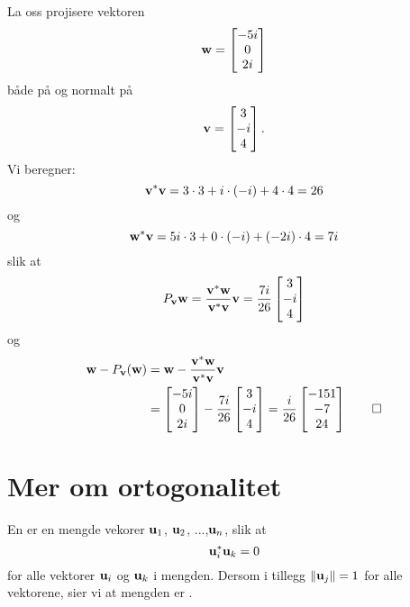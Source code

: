 \begin{ex}
La oss projisere vektoren 
\[
\mathbf{w}=
\begin{bmatrix}
 -5i  \\
 0  \\
2i 
\end{bmatrix}
\]
både på og normalt på
\[
\mathbf{v}=
\begin{bmatrix}
 3 \\
 -i \\
 4
\end{bmatrix}.
\]
Vi beregner:
\[
\mathbf{v}^* \mathbf{v}=3\cdot 3+i\cdot (-i)+4\cdot 4=26
\]
og
\[
\mathbf{w}^* \mathbf{v}=5i\cdot 3+0\cdot (-i)+(-2i)\cdot 4=7i
\]
slik at
\begin{align*}
P_{\mathbf{v}}\mathbf{w} =\frac{ \mathbf{v}^*\mathbf{w}}{\mathbf{v}^* \mathbf{v}} \mathbf{v} =
\frac{7i}{26}
\begin{bmatrix}
 3 \\
 -i \\
 4
\end{bmatrix}
\end{align*}
og 
\begin{align*}
 \mathbf{w}-P_{\mathbf{v}}(\mathbf{w})&=\mathbf{w}-\frac{ \mathbf{v}^*\mathbf{w}}{\mathbf{v}^* \mathbf{v}} \mathbf{v} \\&= 
\begin{bmatrix}
 -5i  \\
 0  \\
2i 
\end{bmatrix}
-
\frac{7i}{26}
\begin{bmatrix}
 3 \\
 -i \\
 4
\end{bmatrix}
=
\frac{i}{26}
\begin{bmatrix}
 -151 \\
 -7 \\
 24
\end{bmatrix}\qedhere
\end{align*} 
\end{ex}


\section*{Mer om ortogonalitet}
\begin{defnx}
En  er en mengde vekorer $\mathbf{u}_1$, $\mathbf{u}_2$, ...,$\mathbf{u}_n$, slik at
\[
\mathbf{u}_i^*  \mathbf{u}_k = 0
\]
for alle vektorer $\mathbf{u}_i$ og $\mathbf{u}_k$ i mengden. Dersom i tillegg $\|\mathbf{u}_j \|=1$ for alle vektorene, sier vi at mengden er .
\end{defnx}


